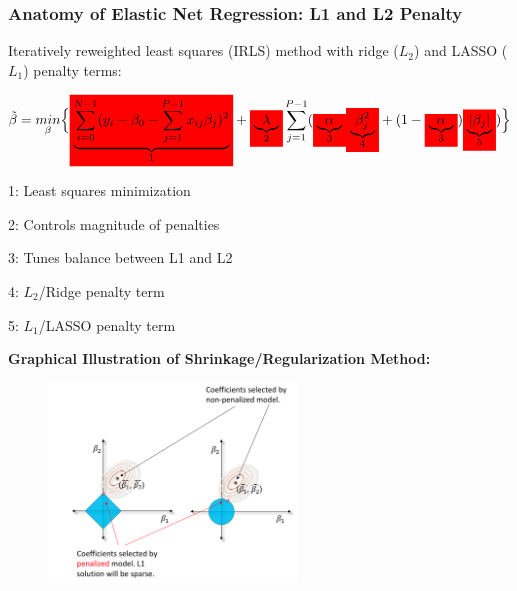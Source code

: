 \documentclass[11pt,aspectratio=169,hyperref={colorlinks}]{beamer}
\newcommand{\mathcolorbox}[2]{\colorbox{#1}{$\displaystyle #2$}}
\begin{document}
		\begin{frame}
		
			\frametitle{Anatomy of Elastic Net Regression: L1 and L2 Penalty}			
		Iteratively reweighted least squares (IRLS) method with ridge ($L_2$) and LASSO ($L_1$) penalty terms: 
			
			\begin{equation}
				\label{eq:Elastic_Net}
				\begin{aligned}
				\tilde{\beta}= \underset{\beta}{min}\Big\{ \mathcolorbox{red}{ \underbrace{\sum_{i=0}^{N-1}(y_i-\beta_0-\sum_{j=1}^{P-1} x_{ij} \beta_{j})^2}_\text{1}} + \mathcolorbox{red}{\underbrace{\lambda}_\text{2}} \sum_{j=1}^{P-1} ( \mathcolorbox{red}{\underbrace{\alpha}_\text{3}} \mathcolorbox{red}{\underbrace{\beta_j^2}_\text{4}} + (1-\mathcolorbox{red}{\underbrace{\alpha}_\text{3}}) \mathcolorbox{red}{\underbrace{|\beta_{j}|}_\text{5}}) \Big\}
				\end{aligned}
			\end{equation}		
			
			\begin{itemize}
			\scriptsize{
				\item{1: Least squares minimization}
				\item{2: Controls magnitude of penalties}
				\item{3: Tunes balance between L1 and L2}
				\item{4: $L_2$/Ridge penalty term}
				\item{5: $L_1$/LASSO penalty term}}
			\end{itemize}
						
		\end{frame}
	
		\begin{frame}
			
			\textbf{Graphical Illustration of Shrinkage/Regularization Method:} 
			
			\begin{figure}[htb]
				\begin{center}
					\includegraphics[height=150pt]{../img/L1L2_penalty_diagram.png}
					\label{fig:L1L2}
				\end{center}
			\end{figure}
								
		\end{frame}				
		
\end{document}
